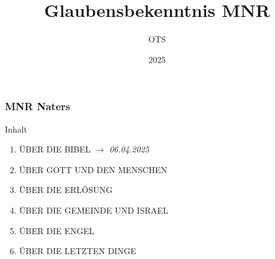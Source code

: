 \documentclass[aspectratio=43]{beamer}
\title{Glaubensbekenntnis MNR}
\author{OTS}
\date{2025}
\begin{document}
\begin{frame}
    \frametitle{MNR Naters}
    \maketitle    
\end{frame}

\begin{frame}{Inhalt}
    \begin{enumerate}
        \item \uppercase{über die bibel} $\longrightarrow$ \textit{06.04.2025}
        \item \uppercase{über gott und den Menschen}
        \item \uppercase{über die Erlösung}
        \item \uppercase{über die Gemeinde und Israel}
        \item \uppercase{über die Engel}
        \item \uppercase{über die letzten Dinge}
    \end{enumerate}
\end{frame}
\end{document}
